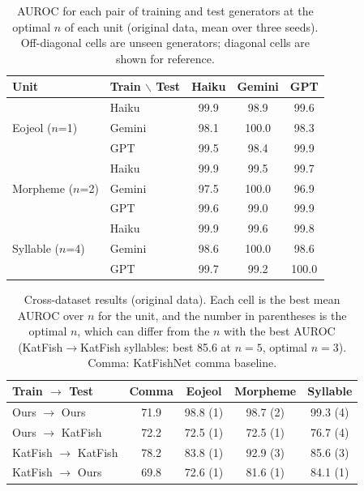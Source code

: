 \begin{table}[t]
\centering
\small
\begin{tabular}{llccc}
\hline
\textbf{Unit} & \textbf{Train $\backslash$ Test} & Haiku & Gemini & GPT \\
\hline
\multirow{3}{*}{Eojeol ($n$=1)} & Haiku & 99.9 & 98.9 & 99.6 \\
 & Gemini & 98.1 & 100.0 & 98.3 \\
 & GPT & 99.5 & 98.4 & 99.9 \\
\hline
\multirow{3}{*}{Morpheme ($n$=2)} & Haiku & 99.9 & 99.5 & 99.7 \\
 & Gemini & 97.5 & 100.0 & 96.9 \\
 & GPT & 99.6 & 99.0 & 99.9 \\
\hline
\multirow{3}{*}{Syllable ($n$=4)} & Haiku & 99.9 & 99.6 & 99.8 \\
 & Gemini & 98.6 & 100.0 & 98.6 \\
 & GPT & 99.7 & 99.2 & 100.0 \\
\hline
\end{tabular}
\caption{AUROC for each pair of training and test generators at the optimal $n$ of each unit (original data, mean over three seeds). Off-diagonal cells are unseen generators; diagonal cells are shown for reference.}
\label{tab:generators}
\end{table}

\begin{table}[t]
\centering
\small
\begin{tabular}{lcccc}
\hline
\textbf{Train $\rightarrow$ Test} & \textbf{Comma} & \textbf{Eojeol} & \textbf{Morpheme} & \textbf{Syllable} \\
\hline
Ours $\rightarrow$ Ours & 71.9 & 98.8 (1) & 98.7 (2) & 99.3 (4) \\
Ours $\rightarrow$ KatFish & 72.2 & 72.5 (1) & 72.5 (1) & 76.7 (4) \\
KatFish $\rightarrow$ KatFish & 78.2 & 83.8 (1) & 92.9 (3) & 85.6 (3) \\
KatFish $\rightarrow$ Ours & 69.8 & 72.6 (1) & 81.6 (1) & 84.1 (1) \\
\hline
\end{tabular}
\caption{Cross-dataset results (original data). Each cell is the best mean AUROC over $n$ for the unit, and the number in parentheses is the optimal $n$, which can differ from the $n$ with the best AUROC (KatFish$\rightarrow$KatFish syllables: best 85.6 at $n=5$, optimal $n=3$). Comma: KatFishNet comma baseline.}
\label{tab:cross}
\end{table}

